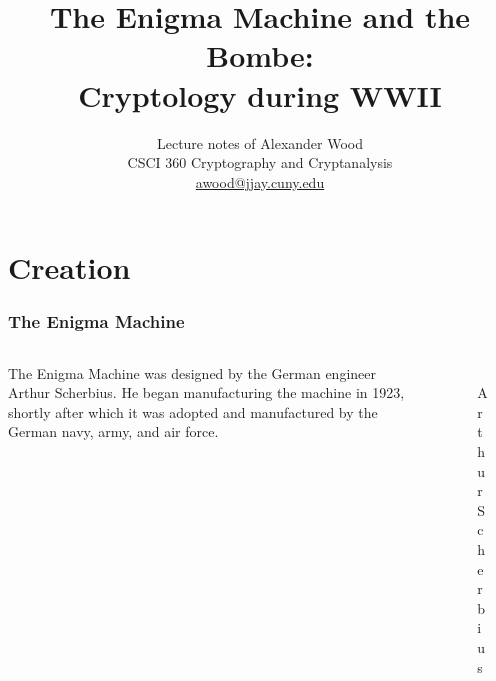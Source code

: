 \documentclass{beamer}
\title[CSCI360]{The Enigma Machine and the Bombe: \\ Cryptology during WWII}
\author
{Lecture notes of Alexander Wood \\ CSCI 360 Cryptography and Cryptanalysis \\ \scriptsize \href{mailto:awood@jjay.cuny.edu}{awood@jjay.cuny.edu}}
\institute[JJay]{John Jay College of Criminal Justice}
\date{}
\newcommand{\<}{\langle}
\renewcommand{\>}{\rangle}
\begin{document}

\begin{frame}
  \titlepage
\end{frame}


\section{Creation} 

\begin{frame}
\frametitle{The Enigma Machine}
\begin{columns}
\begin{column}{.5\textwidth}
The Enigma Machine was designed by the German engineer Arthur Scherbius. He began manufacturing the machine in 1923, shortly after which it was adopted and manufactured by the German navy, army, and air force. 
\end{column}
\begin{column}{.5\textwidth}
\begin{figure}
\includegraphics[scale=1]{IMG/scherbius.jpg}
\caption{\scriptsize Arthur Scherbius}
\end{figure}
\end{column}
\end{columns}
\end{frame}
\end{document}
